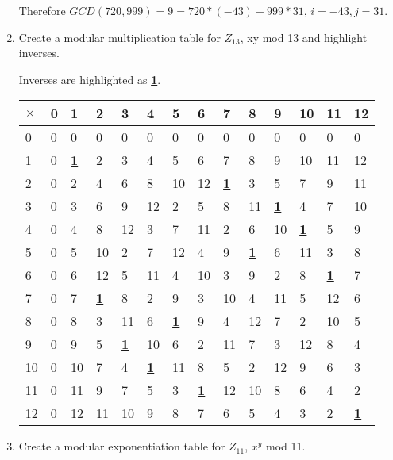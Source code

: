\documentclass[11pt]{article}
\begin{document}
\begin{enumerate}
Therefore $GCD(720, 999) = 9 = 720 * (-43) + 999 * 31$, $i = -43, j
= 31$.

\item Create a modular multiplication table for $Z_{13}$, xy mod 13 and
  highlight inverses.

Inverses are highlighted as \underline{\textbf{1}}.\\

\begin{tabular}{ l | l | l | l | l | l | l | l | l | l | l | l | l | l}
  $\times$ & 0 & 1 & 2 & 3 & 4 & 5 & 6 & 7 & 8 & 9 & 10 & 11 &
  12\\ \hline
  0 & 0 & 0 & 0 & 0 & 0 & 0 & 0 & 0 & 0 & 0 & 0 & 0 & 0\\ \hline
  1 & 0 & \underline{\textbf{1}} & 2 & 3 & 4 & 5 & 6 & 7 & 8 & 9 & 10
  & 11 & 12\\ \hline
  2 & 0 & 2 & 4 & 6 & 8 & 10 & 12 & \underline{\textbf{1}} & 3 & 5 & 7
  & 9 & 11\\ \hline
  3 & 0 & 3 & 6 & 9 & 12 & 2 & 5 & 8 & 11 & \underline{\textbf{1}} & 4 & 7 & 10\\ \hline
  4 & 0 & 4 & 8 & 12 & 3 & 7 & 11 & 2 & 6 & 10 & \underline{\textbf{1}} & 5 & 9\\ \hline
  5 & 0 & 5 & 10 & 2 & 7 & 12 & 4 & 9 & \underline{\textbf{1}} & 6 & 11 & 3 & 8\\ \hline
  6 & 0 & 6 & 12 & 5 & 11 & 4 & 10 & 3 & 9 & 2 & 8 & \underline{\textbf{1}} & 7\\ \hline
  7 & 0 & 7 & \underline{\textbf{1}} & 8 & 2 & 9 & 3 & 10 & 4 & 11 & 5 & 12 & 6\\ \hline
  8 & 0 & 8 & 3 & 11 & 6 & \underline{\textbf{1}} & 9 & 4 & 12 & 7 & 2 & 10 & 5\\ \hline
  9 & 0 & 9 & 5 & \underline{\textbf{1}} & 10 & 6 & 2 & 11 & 7 & 3 & 12 & 8 & 4\\ \hline
  10 & 0 & 10 & 7 & 4 & \underline{\textbf{1}} & 11 & 8 & 5 & 2 & 12 &
  9 & 6 & 3\\ \hline
  11 & 0 & 11 & 9 & 7 & 5 & 3 & \underline{\textbf{1}} & 12 & 10 & 8 & 6 & 4 & 2\\ \hline
  12 & 0 & 12 & 11 & 10 & 9 & 8 & 7 & 6 & 5 & 4 & 3 & 2 & \underline{\textbf{1}}
\end{tabular}


\item Create a modular exponentiation table for $Z_{11}$, $x^y$ mod 11.\\\\\\\\\\\\


\end{enumerate}
\end{document}
